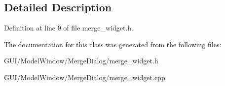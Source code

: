 \subsection{Detailed Description}


Definition at line 9 of file merge\+\_\+widget.\+h.



The documentation for this class was generated from the following files\+:\begin{DoxyCompactItemize}
\item 
G\+U\+I/\+Model\+Window/\+Merge\+Dialog/merge\+\_\+widget.\+h\item 
G\+U\+I/\+Model\+Window/\+Merge\+Dialog/merge\+\_\+widget.\+cpp\end{DoxyCompactItemize}
